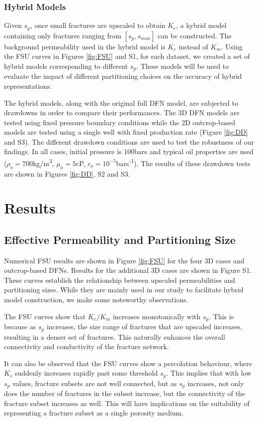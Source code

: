 \documentclass[draft]{agujournal2018}
\begin{document}
\subsubsection{Hybrid Models}
Given $s_p$, once small fractures are upscaled to obtain $K_e$, a hybrid model containing only fractures ranging from $[s_p,s_{max}]$ can be constructed. The background permeability used in the hybrid model is $K_e$ instead of $K_m$. Using the FSU curves in Figures \ref{fig:FSU} and S1, for each dataset, we created a set of hybrid models corresponding to different $s_p$. These models will be used to evaluate the impact of different partitioning choices on the accuracy of hybrid representations.

The hybrid models, along with the original full DFN model, are subjected to drawdowns in order to compare their performances. The 3D DFN models are tested using fixed pressure boundary conditions while the 2D outcrop-based models are tested using a single well with fixed production rate (Figure \ref{fig:DD} and S3). The different drawdown conditions are used to test the robustness of our findings. In all cases, initial pressure is $100$bars and typical oil properties are used ($\rho_o=700$kg/m\textsuperscript{3}, $\mu_o=5$cP, $c_o=10^{-5}$bars\textsuperscript{-1}). The results of these drawdown tests are shown in Figures \ref{fig:DD}, S2 and S3.

\section{Results}
\subsection{Effective Permeability and Partitioning Size}
Numerical FSU results are shown in Figure \ref{fig:FSU} for the four 3D cases and outcrop-based DFNs. Results for the additional 3D cases are shown in Figure S1. These curves establish the relationship between upscaled permeabilities and partitioning sizes. While they are mainly used in our study to facilitate hybrid model construction, we make some noteworthy observations.

The FSU curves show that $K_e/K_m$ increases monotonically with $s_p$. This is because as $s_p$ increases, the size range of fractures that are upscaled increases, resulting in a denser set of fractures. This naturally enhances the overall connectivity and conductivity of the fracture network.

It can also be observed that the FSU curves show a percolation behaviour, where $K_e$ suddenly increases rapidly past some threshold $s_p$. This implies that with low $s_p$ values, fracture subsets are not well connected, but as $s_p$ increases, not only does the number of fractures in the subset increase, but the connectivity of the fracture subset increases as well. This will have implications on the suitability of representing a fracture subset as a single porosity medium.
\end{document}
